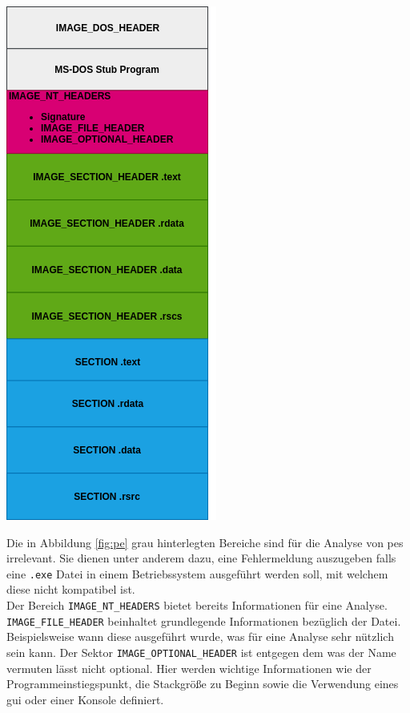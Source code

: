 \documentclass[
    12pt, %
    DIV10,
    ngerman, %
    a4paper, %
    oneside, %
    titlepage, %
    parskip=half, %
    headings=normal, %
    listof=totoc, %
    bibliography=totoc, %
    index=totoc, %
    captions=tableheading, %
    final %
]{scrreprt}
\begin{document}
\begin{center}
\includegraphics[scale=0.5]{img/pe.png}
\label{fig:pe}
\end{center}
Die in Abbildung \ref{fig:pe} grau hinterlegten Bereiche sind für die Analyse von \ac{pes} irrelevant. Sie dienen unter anderem dazu, eine Fehlermeldung auszugeben falls eine \texttt{.exe} Datei in einem Betriebssystem ausgeführt werden soll, mit welchem diese nicht kompatibel ist.\\
Der Bereich \texttt{IMAGE\_NT\_HEADERS} bietet bereits Informationen für eine Analyse. \texttt{IMAGE\_FILE\_HEADER} beinhaltet grundlegende Informationen bezüglich der Datei. Beispielsweise wann diese ausgeführt wurde, was für eine Analyse sehr nützlich sein kann. Der Sektor \texttt{IMAGE\_OPTIONAL\_HEADER} ist entgegen dem was der Name vermuten lässt nicht optional. Hier werden wichtige Informationen wie der Programmeinstiegspunkt, die Stackgrö{\ss}e zu Beginn sowie die Verwendung eines \ac{gui} oder einer Konsole definiert.\\
\end{document}
